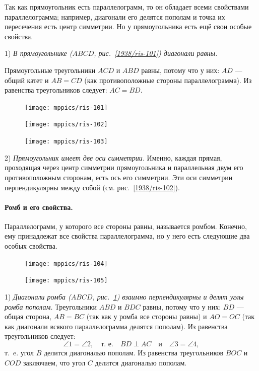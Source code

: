 \documentclass[oneside]{book}
\begin{document}
Так как прямоугольник есть параллелограмм, то он обладает всеми свойствами параллелограмма;
например, диагонали его делятся пополам и точка их пересечения есть центр симметрии.
Но у прямоугольника есть ещё свои особые свойства.

1) \emph{В прямоугольнике \emph{($ABCD$, рис.~\ref{1938/ris-101})} диагонали равны.}

Прямоугольные треугольники $ACD$ и $ABD$ равны, потому что у них:
$AD$ — общий катет и $AB=CD$ (как противоположные стороны параллелограмма).
Из равенства треугольников следует:
$AC = BD$.

\begin{figure}[h!]
\begin{minipage}{.32\textwidth}
\centering
\texttt{[image: mppics/ris-101]}
\caption{}\label{1938/ris-101}
\end{minipage}\hfill
\begin{minipage}{.32\textwidth}
\centering
\texttt{[image: mppics/ris-102]}
\caption{}\label{1938/ris-102}
\end{minipage}\hfill
\begin{minipage}{.32\textwidth}
\centering
\texttt{[image: mppics/ris-103]}
\caption{}\label{1938/ris-103}
\end{minipage}
\end{figure}

2) \emph{Прямоугольник имеет две оси симметрии.}
Именно, каждая прямая, проходящая через центр симметрии прямоугольника и параллельная двум его противоположным сторонам, есть ось его симметрии.
Эти оси симметрии перпендикулярны между собой (см. рис.~\ref{1938/ris-102}). 

\paragraph{Ромб и его свойства.}\label{1938/93}
Параллелограмм, у которого все стороны равны, называется ромбом.
Конечно, ему принадлежат все свойства параллелограмма, но у него есть следующие два особых свойства.

\begin{figure}
\centering
\texttt{[image: mppics/ris-104]}
\caption{}\label{1938/ris-104}
\bigskip
\texttt{[image: mppics/ris-105]}
\caption{}\label{1938/ris-105}
\end{figure}

1) \emph{Диагонали ромба \emph{($ABCD$, рис.~\ref{1938/ris-103})} взаимно перпендикулярны и делят углы ромба пополам.}
Треугольники $ABD$ и $BDC$ равны, потому что у них:
$BD$ — общая сторона, $AB=BC$ (так как у ромба все стороны равны) и $AO=OC$ (так как диагонали всякого параллелограмма делятся пополам).
Из равенства треугольников следует:
\[\angle 1 =\angle 2,
\quad
\text{т.~е.}
\quad
BD\perp AC
\quad
\text{и}
\quad
\angle 3 =\angle 4,
\]
т.~e.
угол $B$ делится диагональю пополам.
Из равенства треугольников $BOC$ и $COD$ заключаем, что угол $C$ делится диагональю пополам.
\end{document}
